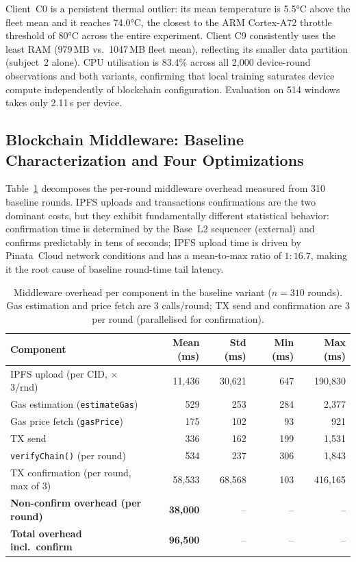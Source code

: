 \documentclass{llncs}
\begin{document}
Client~C0 is a persistent thermal outlier: its mean temperature is
5.5°C above the fleet mean and it reaches 74.0°C, the closest to the
ARM Cortex-A72 throttle threshold of 80°C across the entire experiment.
Client C9 consistently uses the least RAM (979\,MB vs.\ 1047\,MB fleet
mean), reflecting its smaller data partition (subject~2 alone). CPU
utilisation is 83.4\% across all 2{,}000 device-round observations and
both variants, confirming that local training saturates device compute
independently of blockchain configuration. Evaluation on 514 windows
takes only 2.11\,s per device.

\subsection{Blockchain Middleware: Baseline Characterization and Four Optimizations}
\label{subsec:opts}

Table~\ref{tab:overhead} decomposes the per-round middleware overhead
measured from 310 baseline rounds. IPFS uploads and transactions
confirmations are the two dominant costs, but they exhibit fundamentally
different statistical behavior: confirmation time is determined by the
Base~L2 sequencer (external) and confirms predictably in tens of seconds;
IPFS upload time is driven by Pinata~Cloud network conditions and has a
mean-to-max ratio of $1{:}16.7$, making it the root cause of baseline
round-time tail latency.

\begin{table}[t]
\caption{Middleware overhead per component in the baseline variant
  ($n=310$ rounds). Gas estimation and price fetch are 3 calls/round;
  TX send and confirmation are 3 per round (parallelised for confirmation).}
\label{tab:overhead}
\centering\scriptsize
\setlength{\tabcolsep}{2pt}
\begin{tabular}{lrrrr}
\toprule
\textbf{Component} & \textbf{Mean (ms)} & \textbf{Std (ms)}
  & \textbf{Min (ms)} & \textbf{Max (ms)} \\
\midrule
IPFS upload (per CID, $\times$3/rnd)
  & 11{,}436 & 30{,}621 & \phantom{0}647 & 190{,}830 \\
Gas estimation (\texttt{estimateGas})
  & \phantom{0}529 & \phantom{00}253 & \phantom{0}284 & \phantom{00}2{,}377 \\
Gas price fetch (\texttt{gasPrice})
  & \phantom{0}175 & \phantom{00}102 & \phantom{00}93 & \phantom{00,0}921 \\
TX send                                
  & \phantom{0}336 & \phantom{00}162 & \phantom{0}199 & \phantom{00}1{,}531 \\
\texttt{verifyChain()} (per round)     
  & \phantom{0}534 & \phantom{00}237 & \phantom{0}306 & \phantom{00}1{,}843 \\
TX confirmation (per round, max of 3)  
  & 58{,}533 & 68{,}568 & \phantom{00}103 & 416{,}165 \\
\midrule
\textbf{Non-confirm overhead (per round)}
  & \textbf{38{,}000} & -- & -- & -- \\
\textbf{Total overhead incl.\ confirm}
  & \textbf{96{,}500} & -- & -- & -- \\
\bottomrule
\end{tabular}
\end{table}
\end{document}
